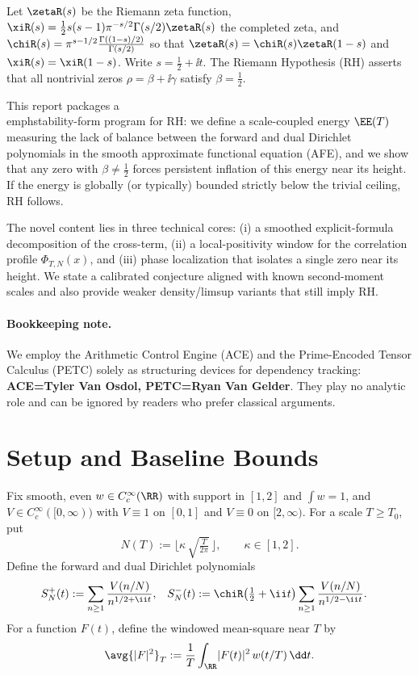 Let $\zetaR(s)$ be the Riemann zeta function, $\xiR(s)=\tfrac12 s(s-1)\pi^{-s/2}\Gamma(s/2)\zetaR(s)$ the completed zeta, and $\chiR(s)=\pi^{s-1/2}\tfrac{\Gamma((1-s)/2)}{\Gamma(s/2)}$ so that $\zetaR(s)=\chiR(s)\zetaR(1-s)$ and $\xiR(s)=\xiR(1-s)$. Write $s=\tfrac12+\ii t$. The Riemann Hypothesis (RH) asserts that all nontrivial zeros $\rho=\beta+\ii\gamma$ satisfy $\beta=\tfrac12$.

This report packages a \\emph{stability-form} program for RH: we define a scale-coupled energy $\EE(T)$ measuring the lack of balance between the forward and dual Dirichlet polynomials in the smooth approximate functional equation (AFE), and we show that any zero with $\beta\neq\tfrac12$ forces persistent inflation of this energy near its height. If the energy is globally (or typically) bounded strictly below the trivial ceiling, RH follows.

The novel content lies in three technical cores: (i) a smoothed explicit-formula decomposition of the cross-term, (ii) a local-positivity window for the correlation profile $\Phi_{T,N}(x)$, and (iii) phase localization that isolates a single zero near its height. We state a calibrated conjecture aligned with known second-moment scales and also provide weaker density/limsup variants that still imply RH.

\paragraph{Bookkeeping note.} We employ the Arithmetic Control Engine (ACE) and the Prime-Encoded Tensor Calculus (PETC) solely as structuring devices for dependency tracking: \textbf{ACE=Tyler Van Osdol, PETC=Ryan Van Gelder}. They play no analytic role and can be ignored by readers who prefer classical arguments.

\section{Setup and Baseline Bounds}
Fix smooth, even $w\in C_c^\infty(\RR)$ with support in $[1,2]$ and $\int w=1$, and $V\in C_c^\infty([0,\infty))$ with $V\equiv1$ on $[0,1]$ and $V\equiv0$ on $[2,\infty)$.
For a scale $T\ge T_0$, put
\begin{equation}
N(T):=\Big\lfloor \kappa\,\sqrt{\tfrac{T}{2\pi}}\,\Big\rfloor,\qquad \kappa\in[1,2].
\end{equation}
Define the forward and dual Dirichlet polynomials
\begin{align}
S_N^+(t)&:=\sum_{n\ge1}\frac{V(n/N)}{n^{1/2+\ii t}},
&
S_N^-(t)&:=\chiR\!\left(\tfrac12+\ii t\right)\sum_{n\ge1}\frac{V(n/N)}{n^{1/2-\ii t}}.
\end{align}
For a function $F(t)$, define the windowed mean-square near $T$ by
\begin{equation}
\avg{\lvert F\rvert^2}_T:=\frac1T\int_{\RR} \lvert F(t)\rvert^2\, w(t/T)\,\dd t.
\end{equation}


